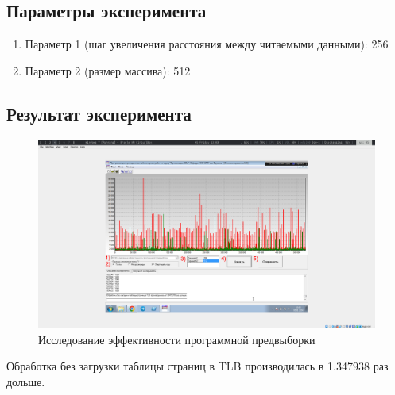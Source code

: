 \documentclass[a4paper,oneside,14pt]{extarticle}
\begin{document}
\subsection{Параметры эксперимента}

\begin{enumerate}
    \item Параметр 1 (шаг увеличения расстояния между читаемыми данными): 256
    \item Параметр 2 (размер массива): 512
\end{enumerate}

\subsection{Результат эксперимента}

\begin{figure}[H]
	\centering
	\includegraphics[width=1\textwidth]{img/3.png}
    \caption{Исследование эффективности программной предвыборки}
	\label{fig:3}
\end{figure}

Обработка без загрузки таблицы страниц в TLB производилась в 1.347938 раз дольше.



\end{document}
